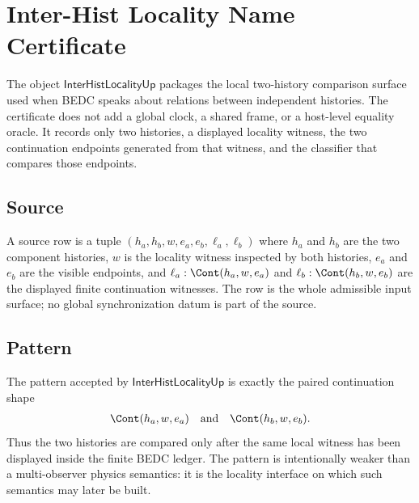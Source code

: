 \providecommand{\InterHistLocalityUp}{\mathsf{InterHistLocality}^{\uparrow}}

\chapter{Inter-Hist Locality Name Certificate}
\label{ch:concrete-instances-inter-hist-locality}

The object $\mathsf{InterHistLocalityUp}$ packages the local two-history
comparison surface used when BEDC speaks about relations between independent
histories.  The certificate does not add a global clock, a shared frame, or a
host-level equality oracle.  It records only two histories, a displayed
locality witness, the two continuation endpoints generated from that witness,
and the classifier that compares those endpoints.

\section{Source}
\label{sec:concrete-instances-inter-hist-locality-source}

\begin{definition}
\label{def:concrete-instances-inter-hist-locality-source}
A source row is a tuple
$(h_a,h_b,w,e_a,e_b,\ell_a,\ell_b)$ where $h_a$ and $h_b$ are the two
component histories, $w$ is the locality witness inspected by both histories,
$e_a$ and $e_b$ are the visible endpoints, and
$\ell_a : \Cont(h_a,w,e_a)$ and $\ell_b : \Cont(h_b,w,e_b)$ are the displayed
finite continuation witnesses.  The row is the whole admissible input surface;
no global synchronization datum is part of the source.
\end{definition}

\section{Pattern}
\label{sec:concrete-instances-inter-hist-locality-pattern}

\begin{definition}
\label{def:concrete-instances-inter-hist-locality-pattern}
The pattern accepted by $\mathsf{InterHistLocalityUp}$ is exactly the paired
continuation shape
$$
\begin{aligned}
  \Cont(h_a,w,e_a) \quad\text{and}\quad \Cont(h_b,w,e_b).
\end{aligned}
$$
Thus the two histories are compared only after the same local witness has been
displayed inside the finite BEDC ledger.  The pattern is intentionally weaker
than a multi-observer physics semantics: it is the locality interface on which
such semantics may later be built.
\end{definition}

